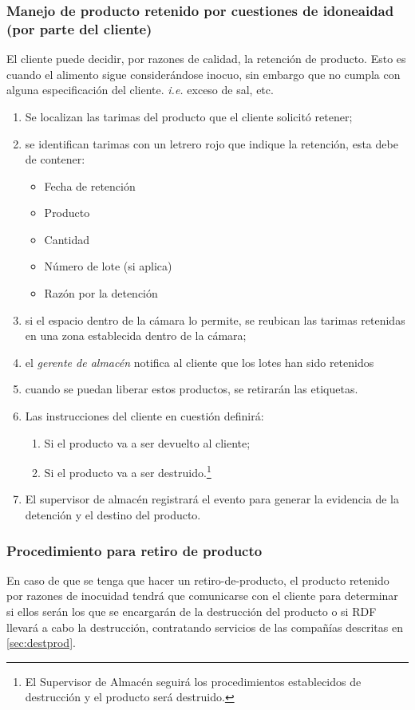 \subsubsection{Manejo de producto retenido por cuestiones de idoneaidad (por parte del cliente)}
El cliente puede decidir, por razones de calidad, la retención de producto. Esto es cuando el alimento sigue considerándose inocuo, sin embargo que no cumpla con alguna especificación del cliente. \textit{i.e.} exceso de sal, etc. 

\begin{enumerate}
	\item Se localizan las tarimas del producto que el cliente solicitó retener;
	\item se identifican tarimas con un letrero rojo que indique la retención, esta debe de contener:
		\begin{itemize}
		\item Fecha de retención
		\item Producto
		\item Cantidad
		\item Número de lote (si aplica)
		\item Razón por la detención
		\end{itemize}
	\item si el espacio dentro de la cámara lo permite, se reubican las tarimas retenidas en una zona establecida dentro de la cámara;
	\item el \emph{gerente de almacén} notifica al cliente que los lotes han sido retenidos
	\item cuando se puedan liberar estos productos, se retirarán las etiquetas.
	\item Las instrucciones del cliente en cuestión definirá:
	\begin{enumerate}
		\item Si el producto va a ser devuelto al cliente;
		\item Si el producto va a ser destruido.\footnote{El Supervisor de Almacén seguirá los procedimientos establecidos de destrucción y el producto será destruido.}
	\end{enumerate}
	\item El supervisor de almacén registrará el evento para generar la evidencia de la detención y el destino del producto.
\end{enumerate}

\subsubsection{Procedimiento para retiro de producto}
En caso de que se tenga que hacer un \gls{retiro-de-producto}, el producto retenido por razones de inocuidad tendrá que comunicarse con el cliente para determinar si ellos serán los que se encargarán de la destrucción del producto o si \gls{RDF} llevará a cabo la destrucción, contratando servicios de las compañías descritas en \cref{sec:destprod}.

